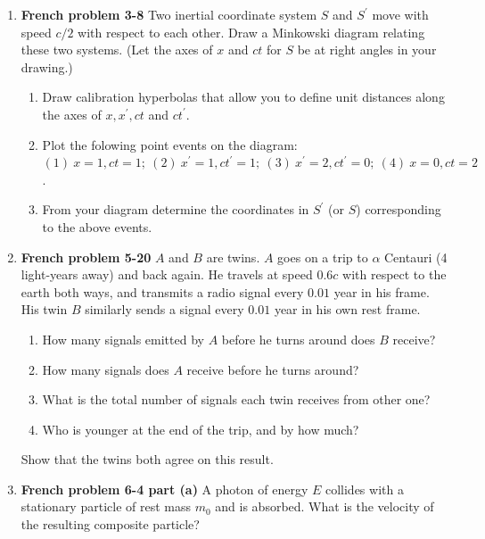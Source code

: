 \documentclass[fleqn]{article}
\begin{document}
  \begin{enumerate}
    \item \textbf{French problem 3-8} 
    Two inertial coordinate system $S$ and $S^'$ move with speed $c/2$ with 
    respect to each other. Draw a Minkowski diagram relating these two 
    systems. (Let the axes of $x$ and $ct$ for $S$ be at right angles in your drawing.)
    \begin{enumerate}
      \item Draw calibration hyperbolas that allow you to define unit distances along the axes of $x, x^', ct$ and $ct^'$.

      \item Plot the folowing point events on the diagram: $(1) ~ x=1, ct=1; ~ (2) ~ x^'=1, ct^'=1; ~ (3) ~ x^'=2, ct^'=0; ~ (4) ~ x=0, ct=2$.


      \item From your diagram determine the coordinates in $S^'$ (or $S$) corresponding to the above events.
      
    \end{enumerate}


    \item \textbf{French problem 5-20} $A$ and $B$ are twins. $A$ goes on a trip to $\alpha$ Centauri (4 light-years away) and back again.
    He travels at speed $0.6c$ with respect to the earth both ways, and transmits a radio signal every $0.01$ year in his frame.
    His twin $B$ similarly sends a signal every $0.01$ year in his own rest frame. 

    \begin{enumerate}
      \item How many signals emitted by $A$ before he turns around does $B$ receive?
      
      \item How many signals does $A$ receive before he turns around?
      
      \item What is the total number of signals each twin receives from other one?
      
      \item Who is younger at the end of the trip, and by how much? 
    \end{enumerate}
    Show that the twins both agree on this result.
    

    \item \textbf{French problem 6-4 part (a)} A photon of energy $E$ collides with a stationary particle of rest mass $m_0$ and 
    is absorbed. What is the velocity of the resulting composite particle?


\end{enumerate}
\end{document}
